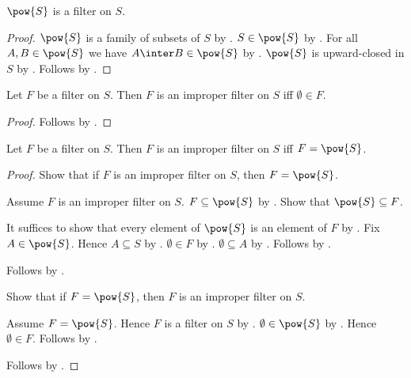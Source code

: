 \begin{proposition}\label{powerset_is_filter}
    $\pow{S}$ is a filter on $S$.
\end{proposition}
\begin{proof}
    $\pow{S}$ is a family of subsets of $S$
        by .
    $S\in\pow{S}$ by .
    For all $A,B\in\pow{S}$ we have $A\inter B\in\pow{S}$
        by .
    $\pow{S}$ is upward-closed in $S$
        by .
    Follows by .
\end{proof}

\begin{theorem}\label{improper_filter_iff_emptyset_in}
    Let $F$ be a filter on $S$.
    Then $F$ is an improper filter on $S$ iff $\emptyset\in F$.
\end{theorem}
\begin{proof}
    Follows by .
\end{proof}

\begin{theorem}\label{improper_filter_iff_powerset}
    Let $F$ be a filter on $S$.
    Then $F$ is an improper filter on $S$ iff $F=\pow{S}$.
\end{theorem}
\begin{proof}
    Show that if $F$ is an improper filter on $S$, then $F=\pow{S}$.
    \begin{subproof}
        Assume $F$ is an improper filter on $S$.
        $F\subseteq\pow{S}$ by .
        Show that $\pow{S}\subseteq F$.
        \begin{subproof}
            It suffices to show that every element of $\pow{S}$ is an
                element of $F$ by .
            Fix $A\in\pow{S}$.
            Hence $A\subseteq S$ by .
            $\emptyset\in F$ by .
            $\emptyset\subseteq A$ by .
            Follows by .
        \end{subproof}
        Follows by .
    \end{subproof}

    Show that if $F=\pow{S}$, then $F$ is an improper filter on $S$.
    \begin{subproof}
        Assume $F=\pow{S}$.
        Hence $F$ is a filter on $S$ by .
        $\emptyset\in\pow{S}$ by .
        Hence $\emptyset\in F$.
        Follows by .
    \end{subproof}
    Follows by \auto.
\end{proof}

